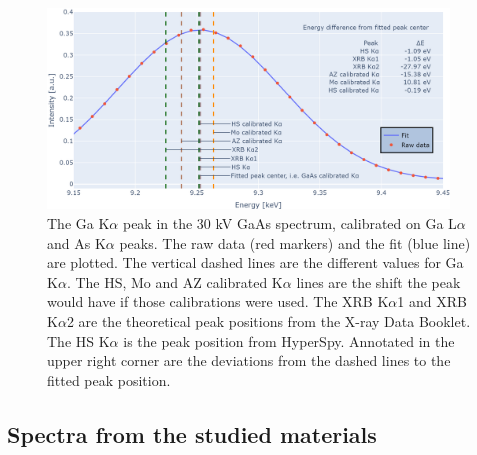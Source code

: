\begin{figure}[p]
    \centering
    \includegraphics[width=0.95\textwidth]{figures/Ga-K.png}
    \caption{
        The Ga K$\alpha$ peak in the 30 kV GaAs spectrum, calibrated on Ga L$\alpha$ and As K$\alpha$ peaks.
        The raw data (red markers) and the fit (blue line) are plotted.
        The vertical dashed lines are the different values for Ga K$\alpha$.
        The HS, Mo and AZ calibrated K$\alpha$ lines are the shift the peak would have if those calibrations were used.
        The XRB K$\alpha$1 and XRB K$\alpha$2 are the theoretical peak positions from the X-ray Data Booklet.
        The HS K$\alpha$ is the peak position from HyperSpy.
        Annotated in the upper right corner are the deviations from the dashed lines to the fitted peak position.
    }
    \label{fig:results:Ga-K}
\end{figure}


\clearpage

\subsection{Spectra from the studied materials}
\label{sec:results:qualitative:each_sample_area}

